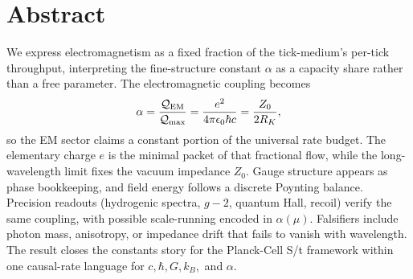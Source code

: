 \section*{Abstract}
We express electromagnetism as a fixed fraction of the tick-medium’s
per-tick throughput, interpreting the fine-structure constant
\(\alpha\) as a capacity share rather than a free parameter.
The electromagnetic coupling becomes
\[
\alpha = \frac{\mathcal Q_{\rm EM}}{\mathcal Q_{\max}}
       = \frac{e^2}{4\pi\epsilon_0\hbar c}
       = \frac{Z_0}{2R_K},
\]
so the EM sector claims a constant portion of the universal rate budget.
The elementary charge \(e\) is the minimal packet of that fractional flow,
while the long-wavelength limit fixes the vacuum impedance \(Z_0\).
Gauge structure appears as phase bookkeeping, and field energy follows a
discrete Poynting balance. Precision readouts (hydrogenic spectra,
\(g{-}2\), quantum Hall, recoil) verify the same coupling, with possible
scale-running encoded in \(\alpha(\mu)\).
Falsifiers include photon mass, anisotropy, or impedance drift that fails
to vanish with wavelength. The result closes the constants story for the
Planck-Cell S/t framework within one causal-rate language for
\(c,\hbar,G,k_B,\) and \(\alpha\).
